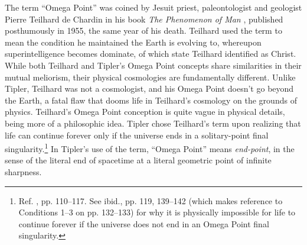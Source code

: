 \documentclass[letterpaper,12pt]{article}
\begin{document}
The term ``Omega Point'' was coined by Jesuit priest, paleontologist and geologist Pierre Teilhard de Chardin in his book \emph{The Phenomenon of Man} \cite{Teilhard1955}, published posthumously in 1955, the same year of his death. Teilhard used the term to mean the condition he maintained the Earth is evolving to, whereupon superintelligence becomes dominate, of which state Teilhard identified as Christ. While both Teilhard and Tipler's Omega Point concepts share similarities in their mutual meliorism, their physical cosmologies are fundamentally different. Unlike Tipler, Teilhard was not a cosmologist, and his Omega Point doesn't go beyond the Earth, a fatal flaw that dooms life in Teilhard's cosmology on the grounds of physics. Teilhard's Omega Point conception is quite vague in physical details, being more of a philosophic idea. Tipler chose Teilhard's term upon realizing that life can continue forever only if the universe ends in a solitary-point final singularity.\footnote{\label{foot:InfiniteLifeRequiresOP}Ref. , pp. 110--117. See ibid., pp. 119, 139--142 (which makes reference to Conditions 1--3 on pp. 132--133) for why it is physically impossible for life to continue forever if the universe does not end in an Omega Point final singularity.} In Tipler's use of the term, ``Omega Point'' means \emph{end-point}, in the sense of the literal end of spacetime at a literal geometric point of infinite sharpness.
\end{document}

